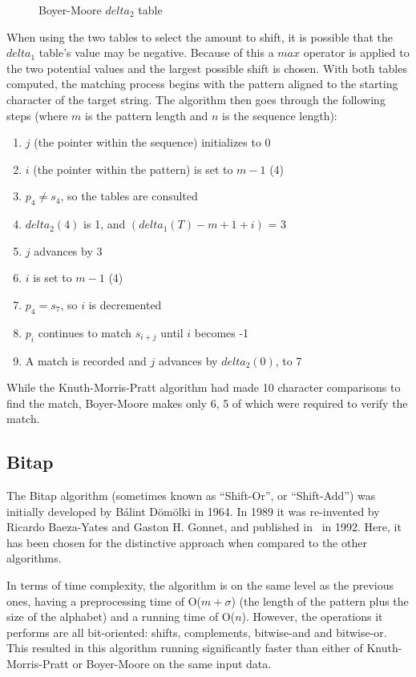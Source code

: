 \begin{figure}[ht]
\centering

\caption{Boyer-Moore $delta_2$ table}
\label{fig:bm_good_suffix}
\end{figure}

When using the two tables to select the amount to shift, it is possible that the $delta_1$ table's value may be negative. Because of this a $max$ operator is applied to the two potential values and the largest possible shift is chosen. With both tables computed, the matching process begins with the pattern aligned to the starting character of the target string. The algorithm then goes through the following steps (where $m$ is the pattern length and $n$ is the sequence length):

\begin{enumerate}
\item $j$ (the pointer within the sequence) initializes to 0
\item $i$ (the pointer within the pattern) is set to $m - 1$ (4)
\item $p_4 \neq s_4$, so the tables are consulted
\item $delta_2(4)$ is 1, and $(delta_1(T) - m + 1 + i)$ = 3
\item $j$ advances by 3
\item $i$ is set to $m - 1$ (4)
\item $p_4 = s_7$, so $i$ is decremented
\item $p_i$ continues to match $s_{i+j}$ until $i$ becomes -1
\item A match is recorded and $j$ advances by $delta_2(0)$, to 7
\end{enumerate}

While the Knuth-Morris-Pratt algorithm had made 10 character comparisons to find the match, Boyer-Moore makes only 6, 5 of which were required to verify the match.

\subsection{Bitap}

The Bitap algorithm (sometimes known as ``Shift-Or'', or ``Shift-Add'') was initially developed by B\'{a}lint D\"{o}m\"{o}lki in 1964. In 1989 it was re-invented by Ricardo Baeza-Yates and Gaston H. Gonnet, and published in~\cite{baeza.yates.gonnet.1992} in 1992. Here, it has been chosen for the distinctive approach when compared to the other algorithms.

In terms of time complexity, the algorithm is on the same level as the previous ones, having a preprocessing time of O($m+\sigma$) (the length of the pattern plus the size of the alphabet) and a running time of O($n$). However, the operations it performs are all bit-oriented: shifts, complements, bitwise-and and bitwise-or. This resulted in this algorithm running significantly faster than either of Knuth-Morris-Pratt or Boyer-Moore on the same input data.

